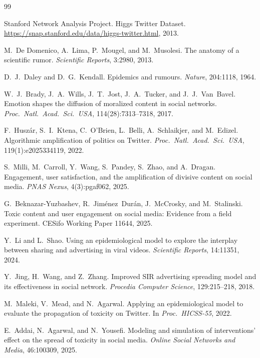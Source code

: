 \documentclass[11pt]{article}
\begin{document}
\begingroup
\footnotesize
\begin{thebibliography}{99}

Stanford Network Analysis Project.
Higgs Twitter Dataset.
\url{https://snap.stanford.edu/data/higgs-twitter.html}, 2013.

M.~De Domenico, A.~Lima, P.~Mougel, and M.~Musolesi.
The anatomy of a scientific rumor.
\textit{Scientific Reports}, 3:2980, 2013.

D.~J.~Daley and D.~G.~Kendall.
Epidemics and rumours.
\textit{Nature}, 204:1118, 1964.

W.~J.~Brady, J.~A.~Wills, J.~T.~Jost, J.~A.~Tucker, and J.~J.~Van~Bavel.
Emotion shapes the diffusion of moralized content in social networks.
\textit{Proc.\ Natl.\ Acad.\ Sci.\ USA}, 114(28):7313--7318, 2017.

F.~Husz\'{a}r, S.~I.~Ktena, C.~O'Brien, L.~Belli, A.~Schlaikjer, and M.~Edizel.
Algorithmic amplification of politics on Twitter.
\textit{Proc.\ Natl.\ Acad.\ Sci.\ USA}, 119(1):e2025334119, 2022.

S.~Milli, M.~Carroll, Y.~Wang, S.~Pandey, S.~Zhao, and A.~Dragan.
Engagement, user satisfaction, and the amplification of divisive content on social media.
\textit{PNAS Nexus}, 4(3):pgaf062, 2025.

G.~Beknazar-Yuzbashev, R.~Jim\'{e}nez~Dur\'{a}n, J.~McCrosky, and M.~Stalinski.
Toxic content and user engagement on social media: Evidence from a field experiment.
CESifo Working Paper 11644, 2025.

Y.~Li and L.~Shao.
Using an epidemiological model to explore the interplay between sharing and advertising in viral videos.
\textit{Scientific Reports}, 14:11351, 2024.

Y.~Jing, H.~Wang, and Z.~Zhang.
Improved SIR advertising spreading model and its effectiveness in social network.
\textit{Procedia Computer Science}, 129:215--218, 2018.

M.~Maleki, V.~Mead, and N.~Agarwal.
Applying an epidemiological model to evaluate the propagation of toxicity on Twitter.
In \textit{Proc.\ HICSS-55}, 2022.

E.~Addai, N.~Agarwal, and N.~Yousefi.
Modeling and simulation of interventions' effect on the spread of toxicity in social media.
\textit{Online Social Networks and Media}, 46:100309, 2025.


\end{thebibliography}
\end{document}
